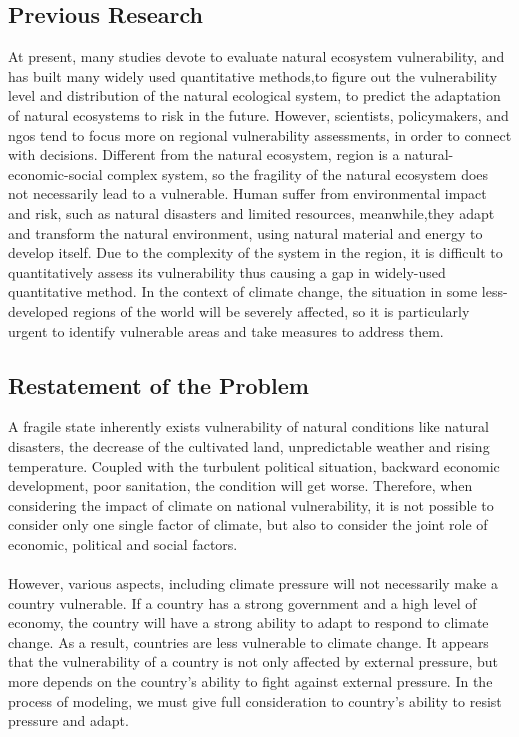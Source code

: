 \documentclass{mcmthesis}
\begin{document}
\subsection{Previous Research}
At present, many studies devote to evaluate natural ecosystem vulnerability, 
and has built many widely used quantitative methods,to figure out the 
vulnerability level and distribution of the natural ecological system, 
to predict the adaptation of natural ecosystems to risk in the future. However, 
scientists, policymakers, and ngos tend to focus more on regional 
vulnerability assessments, in order to connect with decisions. Different 
from the natural ecosystem, region is a natural-economic-social complex 
system, so the fragility of the natural ecosystem does not necessarily lead 
to a vulnerable. Human suffer from environmental impact and risk, such as 
natural disasters and limited resources, meanwhile,they adapt and transform 
the natural environment, using natural material and energy to develop itself.
Due to the complexity of the system in the region, it is difficult to 
quantitatively assess its vulnerability thus causing a gap in widely-used 
quantitative method. In the context of climate change, the situation in some
less-developed regions of the world will be severely affected, so it is 
particularly urgent to identify vulnerable areas and take measures to 
address them.


\subsection{Restatement of the Problem}
A fragile state inherently exists vulnerability of natural conditions 
like natural disasters, the decrease of the cultivated land, unpredictable 
weather and rising temperature. Coupled with the turbulent political situation, 
backward economic development, poor sanitation, the condition will get worse. 
Therefore, when considering the impact of climate on national vulnerability, 
it is not possible to consider only one single factor of climate, but also to
consider the joint role of economic, political and social factors.\\\\
However, various aspects, including climate pressure will not necessarily 
make a country vulnerable. If a country has a strong government and a high 
level of economy, the country will have a strong ability to adapt to respond
to climate change. As a result, countries are less vulnerable to climate 
change. It appears that the vulnerability of a country is not only affected
by external pressure, but more depends on the country's ability to fight 
against external pressure. In the process of modeling, we must give full 
consideration to country's ability to resist pressure and adapt.
\end{document}
